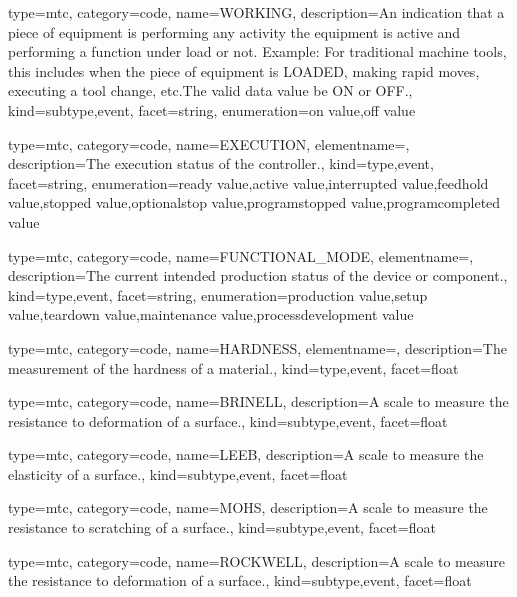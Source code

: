 {
  type=mtc,
  category=code,
  name={WORKING},
  description={An indication that a piece of equipment is performing any activity  the equipment is active and performing a function under load or not. \newline Example: For traditional machine tools, this includes when the piece of equipment is LOADED, making rapid moves, executing a tool change, etc.The \gls{valid data value} \must be ON or OFF.},
  kind={subtype,event},
  facet={\gls{string}},
  enumeration={\gls{on value},\gls{off value}}
}


{
  type=mtc,
  category=code,
  name={EXECUTION},
  elementname=,
  description={The execution status of the \gls{controller}.},
  kind={type,event},
  facet={\gls{string}},
  enumeration={\gls{ready value},\gls{active value},\gls{interrupted value},\gls{feedhold value},\gls{stopped value},\gls{optionalstop value},\gls{programstopped value},\gls{programcompleted value}}
}


{
  type=mtc,
  category=code,
  name={FUNCTIONAL\_MODE},
  elementname=,
  description={The current intended production status of the device or component.},
  kind={type,event},
  facet={\gls{string}},
  enumeration={\gls{production value},\gls{setup value},\gls{teardown value},\gls{maintenance value},\gls{processdevelopment value}}
}


{
  type=mtc,
  category=code,
  name={HARDNESS},
  elementname=,
  description={The measurement of the hardness of a material.},
  kind={type,event},
  facet={\gls{float}}
}


{
  type=mtc,
  category=code,
  name={BRINELL},
  description={A scale to measure the resistance to deformation of a surface.},
  kind={subtype,event},
  facet={\gls{float}}
}


{
  type=mtc,
  category=code,
  name={LEEB},
  description={A scale to measure the elasticity of a surface.},
  kind={subtype,event},
  facet={\gls{float}}
}


{
  type=mtc,
  category=code,
  name={MOHS},
  description={A scale to measure the resistance to scratching of a surface.},
  kind={subtype,event},
  facet={\gls{float}}
}


{
  type=mtc,
  category=code,
  name={ROCKWELL},
  description={A scale to measure the resistance to deformation of a surface.},
  kind={subtype,event},
  facet={\gls{float}}
}


